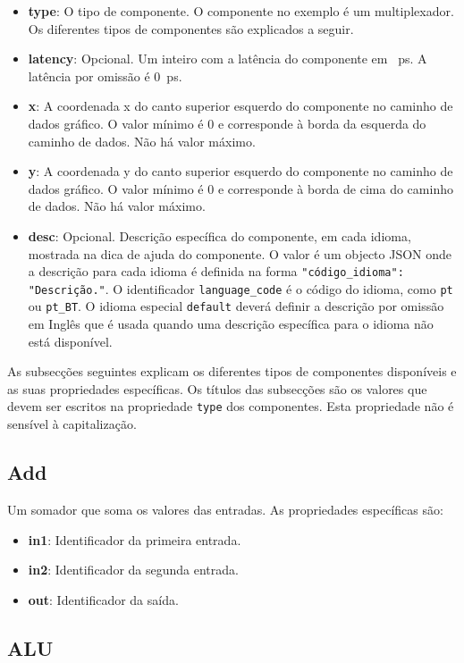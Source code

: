 \documentclass[11pt,a4paper,twoside,titlepage]{report}
\begin{document}
\begin{itemize}
	\item \textbf{type}: O tipo de componente. O componente no exemplo é um
		multiplexador. Os diferentes tipos de componentes são explicados a seguir.
	\item \textbf{latency}: Opcional. Um inteiro com a latência do componente em
		\SI{}{\pico\second}. A latência por omissão é \SI{0}{\pico\second}.
	\item \textbf{x}: A coordenada x do canto superior esquerdo do componente no
		caminho de dados gráfico. O valor mínimo é 0 e corresponde à borda da
		esquerda do caminho de dados. Não há valor máximo.
	\item \textbf{y}: A coordenada y do canto superior esquerdo do componente no
		caminho de dados gráfico. O valor mínimo é 0 e corresponde à borda de
		cima do caminho de dados. Não há valor máximo.
	\item \textbf{desc}: Opcional. Descrição específica do componente, em cada
		idioma, mostrada na dica de ajuda do componente.
		O valor é um objecto JSON onde a descrição para cada idioma é definida na
		forma \verb+"código_idioma": "Descrição."+. O identificador
		\verb+language_code+ é o código do idioma, como \verb+pt+ ou \verb+pt_BT+.
		O idioma especial \verb+default+ deverá definir a descrição por omissão em
		Inglês que é usada quando uma descrição específica para o idioma não está
		disponível.
\end{itemize}

As subsecções seguintes explicam os diferentes tipos de componentes disponíveis
e as suas propriedades específicas.
Os títulos das subsecções são os valores que devem ser escritos na propriedade
\verb+type+ dos componentes. Esta propriedade não é sensível à capitalização.

\subsection{Add}

Um somador que soma os valores das entradas. As propriedades específicas são:
\begin{itemize}
	\item \textbf{in1}: Identificador da primeira entrada.
	\item \textbf{in2}: Identificador da segunda entrada.
	\item \textbf{out}: Identificador da saída.
\end{itemize}

\subsection{ALU}
\end{document}
